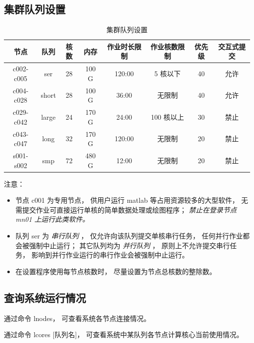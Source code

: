 \documentclass[UTF8]{ctexart}
\newcommand{\myem}[1]{{\color{red}\em #1}}
\newcommand{\mynote}[1]{\colorbox{gray!35}{#1}}
\newcommand{\mynnote}[1]{\colorbox{gray!15}{\color{blue!65}#1}}
\begin{document}
\subsection{集群队列设置}
\begin{table}[h]
  \centering
  \caption{集群队列设置}
  \begin{tabular*}{412pt}{@{\extracolsep{\fill}}cccccccc}
    \toprule
    节点      & 队列  & 核数 & 内存  & 作业时长限制 & 作业核数限制 & 优先级 & 交互式提交 \\
    \midrule
    c002-c005 & ser   & 28   & 100 G  & 120:00 &  5 核以下  & 40 & 允许 \\
    c004-c028 & short & 28   & 100 G  & 36:00  &   无限制   & 40 & 允许 \\
    c029-c042 & large & 24   & 170 G  & 24:00  & 100 核以上 & 30 & 禁止 \\
    c043-c047 & long  & 32   & 170 G  & 120:00 &   无限制   & 20 & 禁止 \\
    s001-s002 & smp   & 72   & 480 G  & 12:00  &   无限制   & 20 & 禁止 \\
    \bottomrule
  \end{tabular*}
\end{table}

注意：
\begin{itemize}
  \setlength{\itemsep}{0pt}
  \setlength{\parsep}{0pt}
  \setlength{\parskip}{0pt}

  \item 节点 \mynote{c001} 为专用节点，
  供用户运行 matlab 等占用资源较多的大型软件，
  无需提交作业可直接运行单核的简单数据处理或绘图程序；
  \myem{禁止在登录节点 \mynote{\rm mn01} 上运行此类软件。}

  \item 队列 \mynote{ser} 为 \myem{串行队列} ，
  仅允许向该队列提交单核串行任务，
  任何并行作业都会被强制中止运行；
  其它队列均为 \myem{并行队列} ，
  原则上不允许提交串行任务，
  影响到并行作业运行的串行作业会被强制中止运行。

  \item 在设置程序使用每节点核数时，
  尽量设置为节点总核数的整除数。
\end{itemize}

\subsection{查询系统运行情况}
通过命令 \mynnote{lnodes}，
可查看系统各节点连接情况。

通过命令 \mynnote{lcores [队列名]}，
可查看系统中某队列各节点计算核心当前使用情况。
\end{document}
